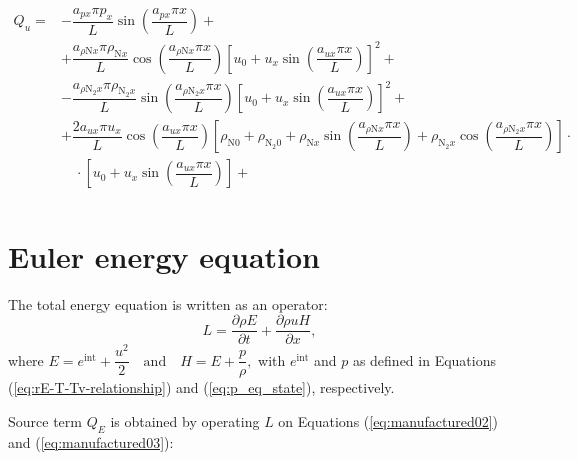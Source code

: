 \documentclass[10pt]{article}
\newcommand{\diff}[2] {\dfrac{\partial #1 }{\partial #2}}
\begin{document}
\begin{equation}
\begin{split}
 Q_u = &- \dfrac{ a_{px} \pi p_x }{L}\sin\left( \dfrac{ a_{px} \pi x }{L} \right)+ \\
&+ \dfrac{ a_{ \rho \text{N} x} \pi \rho_{\text{N}x}}{L} \cos\left( \dfrac{ a_{ \rho \text{N} x} \pi x }{L} \right)\left[ u_0+u_x\sin\left( \dfrac{ a_{ux} \pi x }{L} \right)\right]^{2}+ \\
&- \dfrac{a_{ \rho \text{N}_2 x} \pi \rho_{\text{N}_2 x} }{L}\sin\left( \dfrac{ a_{ \rho \text{N}_2 x} \pi x }{L} \right)\left[ u_0+u_x \sin\left( \dfrac{ a_{ux} \pi x }{L} \right)\right]^{2} + \\
&+\dfrac{2 a_{ux} \pi u_x }{L}\cos\left( \dfrac{ a_{ux} \pi x }{L} \right)\left[\rho_{\text{N}0} +\rho_{\text{N}_2 0}+\rho_{\text{N}x} \sin\left( \dfrac{ a_{ \rho \text{N} x} \pi x }{L} \right)+\rho_{\text{N}_2 x} \cos\left( \dfrac{ a_{ \rho \text{N}_2 x} \pi x }{L} \right)\right]\cdot \\
 &\quad\cdot\left[ u_0+u_x \sin\left( \dfrac{a_{ux} \pi x }{L} \right)\right]+ \\
\end{split}
\end{equation}


\section{Euler energy equation}
The total energy equation is written as an operator:
\begin{equation}
 \label{eq:euler1d_14}
L=\diff{\rho E}{t} + \diff{\rho u H}{x} ,
\end{equation}
where $E=e^{\text{int}} + \dfrac{u^2 }{2} \quad \mbox{and}\quad H= E+ \dfrac{p}{\rho},$ with $e^{\text{int}}$ and $p$ as defined in Equations (\ref{eq:rE-T-Tv-relationship}) and (\ref{eq:p_eq_state}), respectively.

Source term $Q_E$ is obtained by operating $L$ on Equations (\ref{eq:manufactured02}) and (\ref{eq:manufactured03}):
\end{document}
